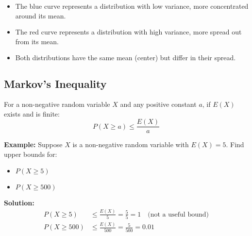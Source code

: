 \documentclass{article}
\begin{document}
    \begin{itemize}
        \item The blue curve represents a distribution with low variance, more concentrated around its mean.
        \item The red curve represents a distribution with high variance, more spread out from its mean.
        \item Both distributions have the same mean (center) but differ in their spread.
    \end{itemize}

    \subsection*{Markov's Inequality}

    For a non-negative random variable $X$ and any positive constant $a$, if $E(X)$ exists and is finite:
    \[
    P(X \geq a) \leq \frac{E(X)}{a}
    \]

    \noindent
    \textbf{Example:}
    Suppose $X$ is a non-negative random variable with $E(X) = 5$. Find upper bounds for:
    \begin{itemize}
        \item $P(X \geq 5)$
        \item $P(X \geq 500)$
    \end{itemize}

    \noindent
    \textbf{Solution:}
    \begin{align*}
        P(X \geq 5) &\leq \frac{E(X)}{5} = \frac{5}{5} = 1 \quad \text{(not a useful bound)} \\
        P(X \geq 500) &\leq \frac{E(X)}{500} = \frac{5}{500} = 0.01
    \end{align*}
\end{document}
